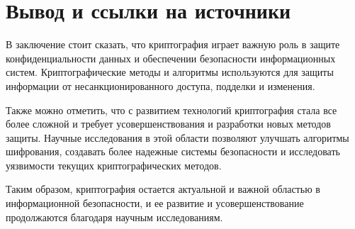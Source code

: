 \documentclass[14pt]{extarticle}
\begin{document}
 





\section{Вывод и ссылки на источники}

В заключение стоит сказать, что криптография играет важную роль в защите конфиденциальности данных и обеспечении безопасности информационных систем. Криптографические методы и алгоритмы используются для защиты информации от несанкционированного доступа, подделки и изменения.

Также можно отметить, что с развитием технологий криптография стала все более сложной и требует усовершенствования и разработки новых методов защиты. Научные исследования в этой области позволяют улучшать алгоритмы шифрования, создавать более надежные системы безопасности и исследовать уязвимости текущих криптографических методов.

Таким образом, криптография остается актуальной и важной областью в информационной безопасности, и ее развитие и усовершенствование продолжаются благодаря научным исследованиям.





\end{document}
